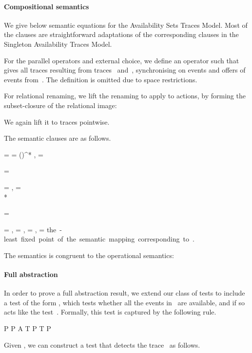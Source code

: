 \paragraph{Compositional semantics}
We give below semantic equations for the Availability Sets Traces Model.  Most
of the clauses are straightforward adaptations of the corresponding clauses in
the Singleton Availability Traces Model.

For the parallel operators and external choice, we define an operator
 such that  gives all
traces resulting from traces~ and~, synchronising on events and
offers of events from~.  The definition is omitted due to space
restrictions. 


For relational renaming, we lift the renaming to apply to  actions, by
forming the subset-closure of the relational image:

We again lift it to traces pointwise.  

The semantic clauses are as follows.
\begin{eqns}
\Tracesap[STOP]  = \Tracesap[\Div] = (\offer \set{})^* ,
\nl
\Tracesap[a \then P] = 
  
\nl
\Tracesap[P \timeout Q] = 
  
\nl
\Tracesap[P \intchoice Q] = 
  \Tracesap[P] \union \Tracesap[Q], 
\nl
\Tracesap[P \extchoice Q] = \\*
\gap
  
\nl
\Tracesap[{P \parallel[A][B] Q}] = 
  
\nl
\Tracesap[P \interleave Q] = 
  ,
\nl
\Tracesap[P \hide A] = 
  ,
\nl
\Tracesap[P\rrn{R}] =
  ,
\nl
\Tracesap[\mu X \spot F(X)] = 
  \mbox{the -least fixed point of the
  semantic mapping corresponding to~.}
\end{eqns}

\begin{theorem}
The semantics is congruent to the operational semantics:

\end{theorem}



\paragraph{Full abstraction}
In order to prove a full abstraction result, we extend our class of tests to
include a test of the form , which tests whether all the
events in~ are available, and if so acts like the test~.  Formally, this
test is captured by the following rule.
\begin{infrule}
P  P
\derive
\Ready A \amp T \parallel P \trans{\tau} T \parallel P
\end{infrule}
Given , we can construct a test 
that detects the trace~ as follows.

